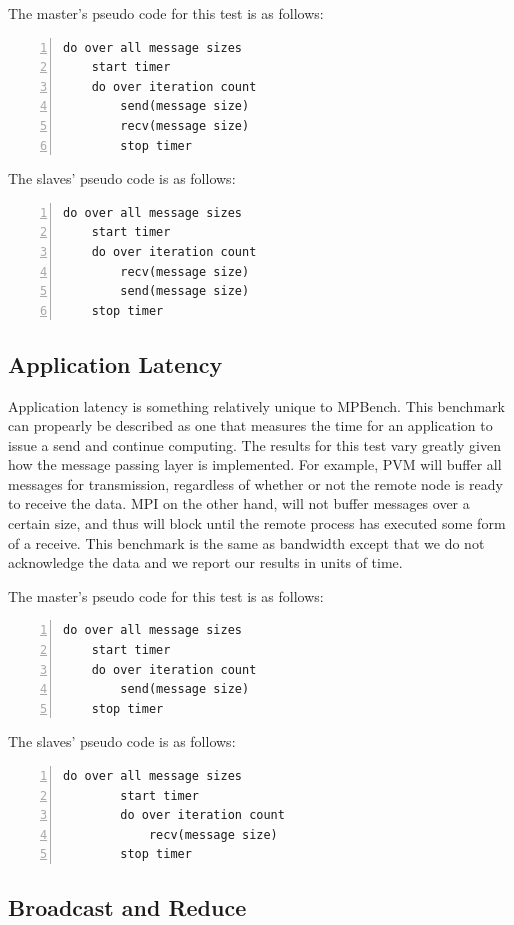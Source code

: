 The master's pseudo code for this test is as follows:

\begin{lstlisting}[frame=single,numbers=left]
  do over all message sizes 
    start timer
    do over iteration count
        send(message size)
        recv(message size) 
        stop timer
\end{lstlisting}

The slaves' pseudo code is as follows:

\begin{lstlisting}[frame=single,numbers=left]
do over all message sizes 
    start timer
    do over iteration count
        recv(message size)
        send(message size)
    stop timer
\end{lstlisting}

\subsection{Application Latency}

Application latency is something relatively unique to MPBench. This benchmark
can propearly be described as one that measures the time for an application
to issue a send and continue computing. The results for this test vary
greatly given how the message passing layer is implemented. For example, PVM
will buffer all messages for transmission, regardless of whether or not the
remote node is ready to receive the data. MPI on the other hand, will not
buffer messages over a certain size, and thus will block until the remote
process has executed some form of a receive. This benchmark is the same as
bandwidth except that we do not acknowledge the data and we report our
results in units of time.

The master's pseudo code for this test is as follows:

\begin{lstlisting}[frame=single,numbers=left]
do over all message sizes 
    start timer
    do over iteration count 
        send(message size) 
    stop timer
\end{lstlisting}    

The slaves' pseudo code is as follows:

\begin{lstlisting}[frame=single,numbers=left]
   do over all message sizes 
        start timer
        do over iteration count 
            recv(message size) 
        stop timer
\end{lstlisting}

\subsection{Broadcast and Reduce}


